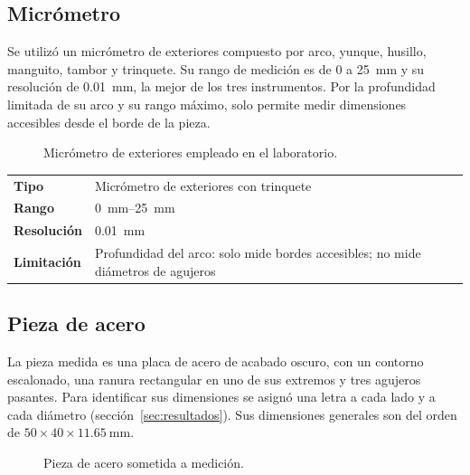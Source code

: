 \documentclass[12pt,a4paper]{article}
\begin{document}
\subsection{Micrómetro}

Se utilizó un micrómetro de exteriores compuesto por arco, yunque, husillo,
manguito, tambor y trinquete. Su rango de medición es de \SI{0}{} a
\SI{25}{\milli\metre} y su resolución de \SI{0.01}{\milli\metre}, la mejor de
los tres instrumentos. Por la profundidad limitada de su arco y su rango máximo,
solo permite medir dimensiones accesibles desde el borde de la pieza.\\[-4pt]

\begin{figure}[H]
	\centering
	\caption{Micrómetro de exteriores empleado en el laboratorio.}
\end{figure}

\begin{table}[!htb]
	\centering
	\small
	\begin{tabularx}{\linewidth}{>{\bfseries}l X}
		Tipo       & Micrómetro de exteriores con trinquete                     \\
		Rango      & \SIrange{0}{25}{\milli\metre}                              \\
		Resolución & \SI{0.01}{\milli\metre}                                    \\
		Limitación & Profundidad del arco: solo mide bordes accesibles; no mide
		diámetros de agujeros                                                   \\
	\end{tabularx}
\end{table}

\subsection{Pieza de acero}

La pieza medida es una placa de acero de acabado oscuro, con un contorno
escalonado, una ranura rectangular en uno de sus extremos y tres agujeros
pasantes. Para identificar sus dimensiones se asignó una letra a cada lado y a
cada diámetro (sección~\ref{sec:resultados}). Sus dimensiones generales son del
orden de $50\times40\times\SI{11.65}{\milli\metre}$.\\[-4pt]

\begin{figure}[H]
	\centering
	\caption{Pieza de acero sometida a medición.}
\end{figure}
\end{document}

